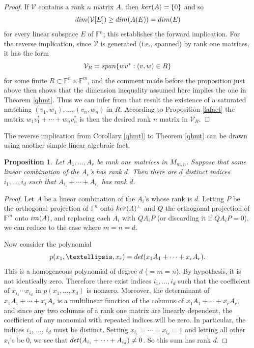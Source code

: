 \documentclass[10pt,a4paper]{amsart}
\newtheorem{prop}[thm]{Proposition}
\begin{document}
\begin{proof}
If $\mathcal{V}$ contains a rank $n$ matrix $A$, then ${\rm ker}(A) = \{0\}$ and so $${\rm dim}(\mathcal{V}[E]) \geq {\rm dim}(A(E)) = {\rm dim}(E)$$ for every linear subspace $E$ of $\mathbb{F}^n$; this establishes the forward implication. For the reverse implication, since $\mathcal{V}$ is generated (i.e., spanned) by rank one matrices, it has the form $$\mathcal{V}_R = {\rm span}\{wv^*: (v,w) \in R\}$$ for some finite $R \subset \mathbb{F}^n \times \mathbb{F}^m$, and the comment made before the proposition just above then shows that the dimension inequality assumed here implies the one in Theorem \ref{qhmt}. Thus we can infer from that result the existence of a saturated matching $(v_1,w_1), \ldots, (v_n,w_n)$ in $R$. According to Proposition \ref{lafact} the matrix $w_1v_1^* + \cdots + w_nv_n^*$ is then the desired rank $n$ matrix in $\mathcal{V}_R$.
\end{proof}

The reverse implication from Corollary \ref{qhmtl} to  Theorem \ref{qhmt} can be drawn using another simple linear algebraic fact.

\begin{prop}\label{lafact2}
Let $A_1, \ldots, A_r$ be rank one matrices in $M_{m,n}$. Suppose that some linear combination of the $A_i$'s has rank $d$. Then there are $d$ distinct indices $i_1, \ldots, i_d$ such that $A_{i_1} + \cdots + A_{i_d}$ has rank $d$.
\end{prop}

\begin{proof}
Let $A$ be a linear combination of the $A_i$'s whose rank is $d$. Letting $P$ be the orthogonal projection of $\mathbb{F}^n$ onto ${\rm ker}(A)^\perp$ and $Q$ the orthogonal projection of $\mathbb{F}^m$ onto ${\rm im}(A)$, and replacing each $A_i$ with $QA_iP$ (or discarding it if $QA_iP = 0$), we can reduce to the case where $m = n = d$.

Now consider the polynomial $$p(x_1, \ldots, x_r) = {\rm det}(x_1A_1 + \cdots + x_rA_r).$$ This is a homogeneous polynomial of degree $d$ ($= m = n$). By hypothesis, it is not identically zero. Therefore there exist indices $i_1, \ldots, i_d$ such that the coefficient of $x_{i_1}\cdots x_{i_d}$ in $p(x_1, \ldots, x_d)$ is nonzero. Moreover, the determinant of $x_1A_1 + \cdots + x_rA_r$ is a multilinear function of the columns of $x_1A_1 + \cdots + x_rA_r$, and since any two columns of a rank one matrix are linearly dependent, the coefficient of any monomial with repeated indices will be zero. In particular, the indices $i_1$, $\ldots$, $i_d$ must be distinct. Setting $x_{i_1} = \cdots = x_{i_d} = 1$ and letting all other $x_i$'s be $0$, we see that ${\rm det}(A_{i_1} + \cdots + A_{i_d}) \neq 0$. So this sum has rank $d$.
\end{proof}
\end{document}
